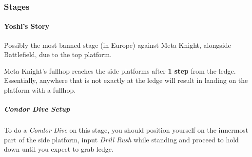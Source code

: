 \subsubsection{Stages} \label{ult-metaknight-stages}

\paragraph{Yoshi's Story}
Possibly the most banned stage (in Europe) against Meta Knight, alongside Battlefield, due to the top platform.

Meta Knight's fullhop reaches the side platforms after \textbf{1 step} from the ledge. Essentially, anywhere that is not exactly at the ledge will result in landing on the platform with a fullhop.

\subparagraph{Condor Dive Setup}
To do a \textit{Condor Dive} on this stage, you should position yourself on the innermost part of the side platform, input \textit{Drill Rush} while standing and proceed to hold down until you expect to grab ledge.